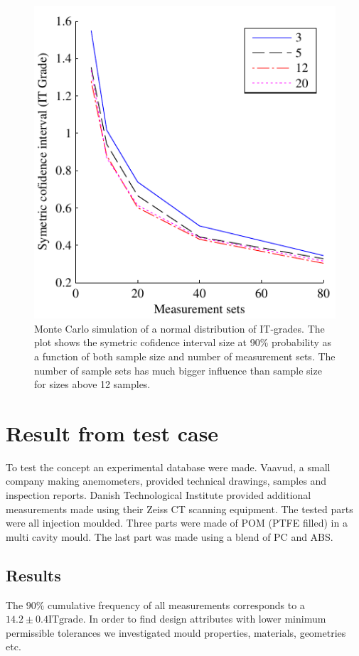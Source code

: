 \documentclass[aip,amsmath, reprint, author-year]{revtex4-1}
\begin{document}
\begin{figure}
\includegraphics{CLW90_lines.pdf}
\caption{\label{fig:cl_line} Monte Carlo simulation of a normal distribution of IT-grades. The plot shows the symetric cofidence interval size at 90\% probability as a function of both sample size and number of measurement sets. 
The number of sample sets has much bigger influence than sample size for sizes above 12 samples. }
\end{figure}

\section{Result from test case}
\label{sec:result}

To test the concept an experimental database were made. Vaavud, a small company making anemometers, provided technical drawings, samples and inspection reports. Danish Technological Institute provided additional measurements made using their Zeiss CT scanning equipment. The tested parts were all injection moulded. Three parts were made of POM (PTFE filled) in a multi cavity mould. The last part was made using a blend of PC and ABS.

\subsection{Results}

The $90\%$ cumulative frequency of all measurements corresponds to a $14.2 \pm 0.4 \mathrm{IT grade}$. In order to find design attributes with lower minimum permissible tolerances we investigated mould properties, materials, geometries etc. 
\end{document}

